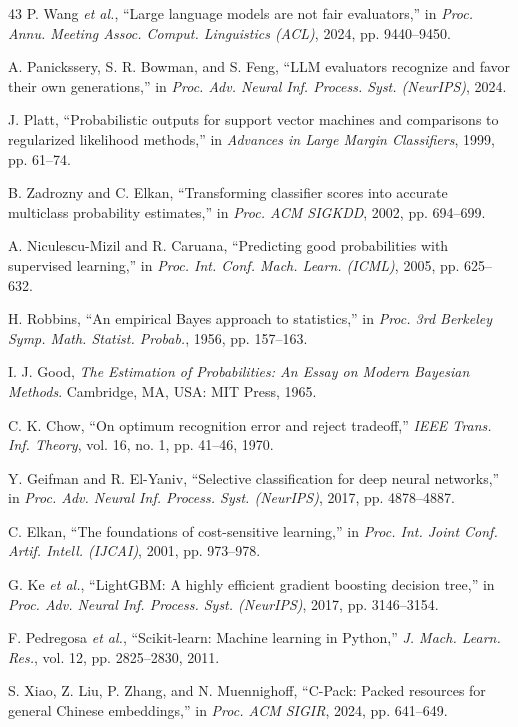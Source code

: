 \documentclass{ieeeaccess}
\begin{document}
\begin{thebibliography}{43}
 P. Wang \emph{et al.}, ``Large language models are not fair evaluators,'' in \emph{Proc. Annu. Meeting Assoc. Comput. Linguistics (ACL)}, 2024, pp. 9440--9450.

 A. Panickssery, S. R. Bowman, and S. Feng, ``LLM evaluators recognize and favor their own generations,'' in \emph{Proc. Adv. Neural Inf. Process. Syst. (NeurIPS)}, 2024.

 J. Platt, ``Probabilistic outputs for support vector machines and comparisons to regularized likelihood methods,'' in \emph{Advances in Large Margin Classifiers}, 1999, pp. 61--74.

 B. Zadrozny and C. Elkan, ``Transforming classifier scores into accurate multiclass probability estimates,'' in \emph{Proc. ACM SIGKDD}, 2002, pp. 694--699.

 A. Niculescu-Mizil and R. Caruana, ``Predicting good probabilities with supervised learning,'' in \emph{Proc. Int. Conf. Mach. Learn. (ICML)}, 2005, pp. 625--632.

 H. Robbins, ``An empirical Bayes approach to statistics,'' in \emph{Proc. 3rd Berkeley Symp. Math. Statist. Probab.}, 1956, pp. 157--163.

 I. J. Good, \emph{The Estimation of Probabilities: An Essay on Modern Bayesian Methods}. Cambridge, MA, USA: MIT Press, 1965.

 C. K. Chow, ``On optimum recognition error and reject tradeoff,'' \emph{IEEE Trans. Inf. Theory}, vol. 16, no. 1, pp. 41--46, 1970.

 Y. Geifman and R. El-Yaniv, ``Selective classification for deep neural networks,'' in \emph{Proc. Adv. Neural Inf. Process. Syst. (NeurIPS)}, 2017, pp. 4878--4887.

 C. Elkan, ``The foundations of cost-sensitive learning,'' in \emph{Proc. Int. Joint Conf. Artif. Intell. (IJCAI)}, 2001, pp. 973--978.

 G. Ke \emph{et al.}, ``LightGBM: A highly efficient gradient boosting decision tree,'' in \emph{Proc. Adv. Neural Inf. Process. Syst. (NeurIPS)}, 2017, pp. 3146--3154.

 F. Pedregosa \emph{et al.}, ``Scikit-learn: Machine learning in Python,'' \emph{J. Mach. Learn. Res.}, vol. 12, pp. 2825--2830, 2011.

 S. Xiao, Z. Liu, P. Zhang, and N. Muennighoff, ``C-Pack: Packed resources for general Chinese embeddings,'' in \emph{Proc. ACM SIGIR}, 2024, pp. 641--649.


\end{thebibliography}
\end{document}
